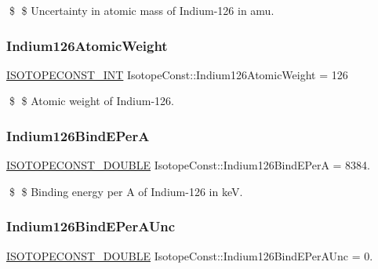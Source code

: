 \$ \$ Uncertainty in atomic mass of Indium-\/126 in amu. \mbox{\label{group___isotope_const-_indium-_in126_gaf9e7a4cc7b33bbce578a643853486a0f}} 
\subsubsection{\texorpdfstring{Indium126\+Atomic\+Weight}{Indium126AtomicWeight}}
{\footnotesize\ttfamily \mbox{\hyperlink{group___isotope_const-_macros_ga5f18360b3e99483a35c32d789e62621c}{I\+S\+O\+T\+O\+P\+E\+C\+O\+N\+S\+T\+\_\+\+I\+NT}} Isotope\+Const\+::\+Indium126\+Atomic\+Weight = 126}

\$ \$ Atomic weight of Indium-\/126. \mbox{\label{group___isotope_const-_indium-_in126_ga473de3d3bf91c64f8c93765bdaf05759}} 
\subsubsection{\texorpdfstring{Indium126\+Bind\+E\+PerA}{Indium126BindEPerA}}
{\footnotesize\ttfamily \mbox{\hyperlink{group___isotope_const-_macros_ga8f45a7272ce02c0b4c65c44636ed719a}{I\+S\+O\+T\+O\+P\+E\+C\+O\+N\+S\+T\+\_\+\+D\+O\+U\+B\+LE}} Isotope\+Const\+::\+Indium126\+Bind\+E\+PerA = 8384.}

\$ \$ Binding energy per A of Indium-\/126 in keV. \mbox{\label{group___isotope_const-_indium-_in126_ga3eaee09d01eb92828f69afbb29f54485}} 
\subsubsection{\texorpdfstring{Indium126\+Bind\+E\+Per\+A\+Unc}{Indium126BindEPerAUnc}}
{\footnotesize\ttfamily \mbox{\hyperlink{group___isotope_const-_macros_ga8f45a7272ce02c0b4c65c44636ed719a}{I\+S\+O\+T\+O\+P\+E\+C\+O\+N\+S\+T\+\_\+\+D\+O\+U\+B\+LE}} Isotope\+Const\+::\+Indium126\+Bind\+E\+Per\+A\+Unc = 0.}

